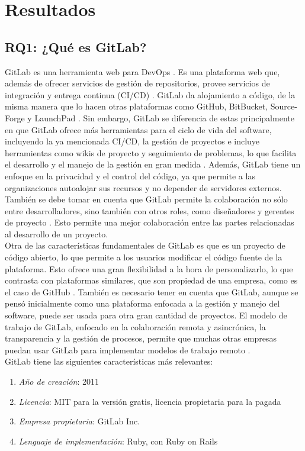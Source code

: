 \documentclass[runningheads]{llncs}
\begin{document}
\section{Resultados}
\subsection{RQ1: ¿Qué es GitLab?}
GitLab es una herramienta web para DevOps \cite{gitlab2022gitlab}. Es una plataforma web que, además de ofrecer
servicios de gestión de repositorios, provee servicios de integración y entrega continua (CI/CD) \cite{fairbanks2023analyzing}.
GitLab da alojamiento a código, de la misma manera que lo hacen otras plataformas como GitHub, BitBucket, Source-Forge
y LaunchPad \cite{safari2020structural}. Sin embargo, GitLab se diferencia de estas principalmente en que GitLab ofrece más
herramientas para el ciclo de vida del software, incluyendo la ya mencionada CI/CD, la gestión de proyectos e incluye
herramientas como wikis de proyecto y seguimiento de problemas, lo que facilita el desarrollo y el manejo de la gestión
en gran medida \cite{safari2020structural}. Además, GitLab tiene un enfoque en la privacidad y el control del código, ya que
permite a las organizaciones autoalojar sus recursos y no depender de servidores externos. También se debe tomar en cuenta que
GitLab permite la colaboración no sólo entre desarrolladores, sino también con otros roles, como diseñadores y
gerentes de proyecto \cite{choudhury2020gitlab}. Esto permite una mejor colaboración entre las partes relacionadas al
desarrollo de un proyecto.\\
Otra de las características fundamentales de GitLab es que es un proyecto de código abierto, lo que permite a los usuarios
modificar el código fuente de la plataforma. Esto ofrece una gran flexibilidad a la hora de personalizarlo, lo que contrasta
con plataformas similares, que son propiedad de una empresa, como es el caso de GitHub \cite{safari2020structural}. También es
necesario tener en cuenta que GitLab, aunque se pensó inicialmente como una plataforma enfocada a la gestión y manejo del software,
puede ser usada para otra gran cantidad de proyectos. El modelo de trabajo de GitLab, enfocado en la colaboración remota y asincrónica,
la transparencia y la gestión de procesos, permite que muchas otras empresas puedan usar GitLab para implementar modelos de
trabajo remoto \cite{choudhury2020gitlab}.\\
GitLab tiene las siguientes características más relevantes:
\begin{enumerate}
        \item \textit{Año de creación}: 2011
        \item \textit{Licencia}: MIT para la versión gratis, licencia propietaria para la pagada
        \item \textit{Empresa propietaria}: GitLab Inc.
        \item \textit{Lenguaje de implementación}: Ruby, con Ruby on Rails
\end{enumerate}
\end{document}
